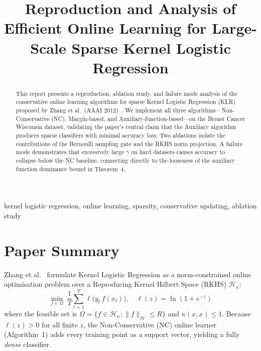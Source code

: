 \documentclass[conference,10pt]{IEEEtran}
\begin{document}
\title{Reproduction and Analysis of Efficient Online Learning for Large-Scale Sparse Kernel Logistic Regression}

\author{
}

\maketitle

\begin{abstract}
This report presents a reproduction, ablation study, and failure mode analysis of the conservative online learning algorithms for sparse Kernel Logistic Regression (KLR) proposed by Zhang et al.\ (AAAI 2012)~\cite{zhang2012efficient}. We implement all three algorithms---Non-Conservative (NC), Margin-based, and Auxiliary-function-based---on the Breast Cancer Wisconsin dataset, validating the paper's central claim that the Auxiliary algorithm produces sparse classifiers with minimal accuracy loss. Two ablations isolate the contributions of the Bernoulli sampling gate and the RKHS norm projection. A failure mode demonstrates that excessively large $\gamma$ on hard datasets causes accuracy to collapse below the NC baseline, connecting directly to the looseness of the auxiliary function dominance bound in Theorem~4.
\end{abstract}

\begin{IEEEkeywords}
kernel logistic regression, online learning, sparsity, conservative updating, ablation study
\end{IEEEkeywords}

\section{Paper Summary}

Zhang et al.~\cite{zhang2012efficient} formulate Kernel Logistic Regression as a norm-constrained online optimisation problem over a Reproducing Kernel Hilbert Space (RKHS) $\mathcal{H}_\kappa$:
\begin{equation}
\min_{f \in \Omega}\; \frac{1}{T}\sum_{t=1}^{T} \ell\!\bigl(y_t\, f(x_t)\bigr), \quad \ell(z) = \ln(1 + e^{-z})
\label{eq:klr}
\end{equation}
where the feasible set is $\Omega = \{f \in \mathcal{H}_\kappa : \|f\|_{\mathcal{H}} \le R\}$ and $\kappa(x,x) \le 1$. Because $\ell(z) > 0$ for all finite $z$, the Non-Conservative (NC) online learner (Algorithm~1) adds every training point as a support vector, yielding a fully \emph{dense} classifier.
\end{document}
